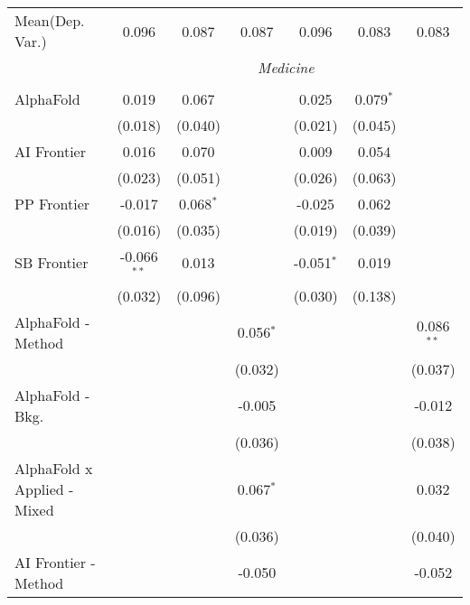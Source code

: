 \begin{tabular}{lcccccc}
Mean(Dep. Var.) & 0.096 & 0.087 & 0.087 & 0.096 & 0.083 & 0.083 \\
 & \multicolumn{6}{c}{\textit{Medicine}} \\ \\
   AlphaFold                   & 0.019         & 0.067       &                & 0.025        & 0.079$^{*}$ &   \\   
                               & (0.018)       & (0.040)     &                & (0.021)      & (0.045)     &   \\   
   AI Frontier                 & 0.016         & 0.070       &                & 0.009        & 0.054       &   \\   
                               & (0.023)       & (0.051)     &                & (0.026)      & (0.063)     &   \\   
   PP Frontier                 & -0.017        & 0.068$^{*}$ &                & -0.025       & 0.062       &   \\   
                               & (0.016)       & (0.035)     &                & (0.019)      & (0.039)     &   \\   
   SB Frontier                 & -0.066$^{**}$ & 0.013       &                & -0.051$^{*}$ & 0.019       &   \\   
                               & (0.032)       & (0.096)     &                & (0.030)      & (0.138)     &   \\   
   AlphaFold - Method          &               &             & 0.056$^{*}$    &              &             & 0.086$^{**}$\\   
                               &               &             & (0.032)        &              &             & (0.037)\\   
   AlphaFold - Bkg.            &               &             & -0.005         &              &             & -0.012\\   
                               &               &             & (0.036)        &              &             & (0.038)\\   
   AlphaFold x Applied - Mixed &               &             & 0.067$^{*}$    &              &             & 0.032\\   
                               &               &             & (0.036)        &              &             & (0.040)\\   
   AI Frontier - Method        &               &             & -0.050         &              &             & -0.052\\   

\end{tabular}
